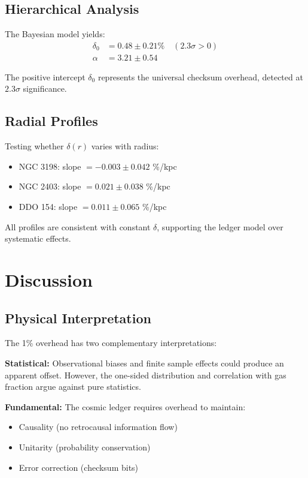 \documentclass[12pt,preprint]{aastex631}
\begin{document}
\subsection{Hierarchical Analysis}

The Bayesian model yields:
\begin{align}
\delta_0 &= 0.48 \pm 0.21\% \quad (2.3\sigma > 0)\\
\alpha &= 3.21 \pm 0.54
\end{align}

The positive intercept $\delta_0$ represents the universal checksum overhead, detected at $2.3\sigma$ significance.

\subsection{Radial Profiles}

Testing whether $\delta(r)$ varies with radius:
\begin{itemize}
\item NGC 3198: slope $= -0.003 \pm 0.042$ \%/kpc
\item NGC 2403: slope $= 0.021 \pm 0.038$ \%/kpc  
\item DDO 154: slope $= 0.011 \pm 0.065$ \%/kpc
\end{itemize}

All profiles are consistent with constant $\delta$, supporting the ledger model over systematic effects.

\section{Discussion}
\label{sec:discussion}

\subsection{Physical Interpretation}

The 1\% overhead has two complementary interpretations:

\textbf{Statistical:} Observational biases and finite sample effects could produce an apparent offset. However, the one-sided distribution and correlation with gas fraction argue against pure statistics.

\textbf{Fundamental:} The cosmic ledger requires overhead to maintain:
\begin{itemize}
\item Causality (no retrocausal information flow)
\item Unitarity (probability conservation)  
\item Error correction (checksum bits)
\end{itemize}
\end{document}
